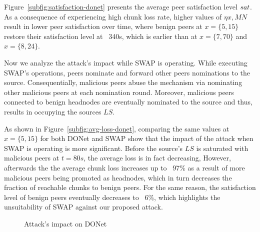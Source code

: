Figure~\ref{subfig:satisfaction-donet} presents the average peer satisfaction level $sat$.
As a consequence of experiencing high chunk loss rate, higher values of $\eta x, MN$ result in lower peer satisfaction over time, where benign peers at $x=\{5, 15\}$ restore their satisfaction level at ~340s, which is earlier than at $x=\{7, 70\}$ and $x=\{8, 24\}$.

Now we analyze the attack's impact while SWAP is operating.
While executing SWAP's operations, peers nominate and forward other peers nominations to the source. 
Consequentially, malicious peers abuse the mechanism via nominating other malicious peers at each nomination round. 
Moreover, malicious peers connected to benign headnodes are eventually nominated to the source and thus, results in occupying the sources $LS$.

As shown in Figure~\ref{subfig:avg-loss-donet}, comparing the same values at $x=\{5, 15\}$ for both DONet and SWAP show that the impact of the attack when SWAP is operating is more significant.
Before the source's $LS$ is saturated with malicious peers at $t=80s$, the average loss is in fact decreasing, However, afterwards the the average chunk loss increases up to ~97\% as a result of more malicious peers being promoted as headnodes, which in turn decreases the fraction of reachable chunks to benign peers.
For the same reason, the satisfaction level of benign peers eventually decreases to ~6\%, which highlights the unsuitability of SWAP against our proposed attack.

\begin{figure}[t!]
\centering

  \mbox{}
 
  \mbox{}
  \caption{Attack's impact on DONet}
  \label{fig:attack-results}
  \end{figure}


